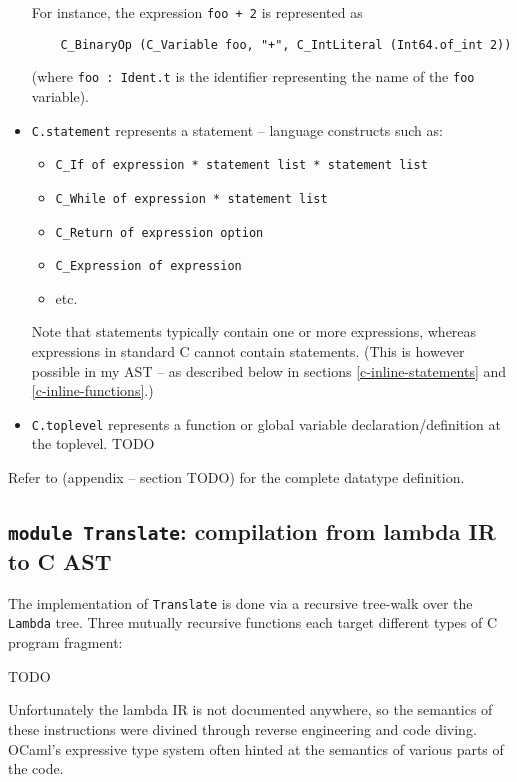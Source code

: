 \documentclass[12pt,a4paper,twoside,openright]{report}
\begin{document}
\begin{itemize}
    For instance, the expression \lstinline!foo + 2! is represented as
    \begin{lstlisting}
    C_BinaryOp (C_Variable foo, "+", C_IntLiteral (Int64.of_int 2))\end{lstlisting}%
    (where \lstinline!foo : Ident.t! is the identifier representing the name of the
    \lstinline!foo! variable).

	\item
		\lstinline!C.statement! represents a statement -- language constructs such as:

        \begin{itemize}
            \item \lstinline!C_If of expression * statement list * statement list!
            \item \lstinline!C_While of expression * statement list!
            \item \lstinline!C_Return of expression option!
            \item \lstinline!C_Expression of expression!
            \item etc.
        \end{itemize}
        Note that statements typically contain one or more expressions, whereas
        expressions in standard C cannot contain statements. (This is however
        possible in my AST -- as described below in sections \ref{c-inline-statements} and \ref{c-inline-functions}.)

	\item
		\lstinline!C.toplevel! represents a function or global variable declaration/definition at the toplevel.
        TODO
\end{itemize}

Refer to (appendix -- section TODO) for the complete datatype definition.

\subsection{\texttt{module Translate}: compilation from lambda IR to C AST}

The implementation of \lstinline!Translate! is done via a recursive tree-walk
over the \lstinline!Lambda! tree. Three mutually recursive functions each
target different types of C program fragment:

TODO

Unfortunately the lambda IR is not documented anywhere, so the semantics
of these instructions were divined through reverse engineering and code diving.
OCaml's expressive type system often hinted at the semantics of various
parts of the code.
\end{document}
